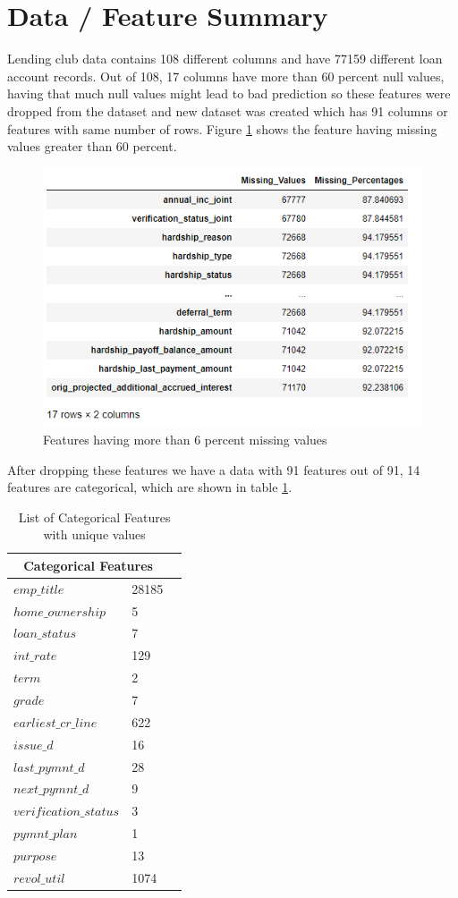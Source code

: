 \documentclass[12pt]{article}
\begin{document}
\section{Data / Feature Summary} 
Lending club data contains 108 different columns and have 77159 different loan account records. Out of 108, 17 columns have more than 60 percent null values, having that much null values might lead to bad prediction so these features were dropped from the dataset and new dataset was created which has 91 columns or features with same number of rows. Figure \ref{fig:MissingValues} shows the feature having missing values greater than 60 percent.
\begin{figure}[h!]
	\centering
	\includegraphics{MissingValues.png}
	\caption{Features having more than 6 percent missing values}
	\label{fig:MissingValues}
\end{figure}
After dropping these features we have a data with 91 features out of 91, 14 features are categorical, which are shown in table \ref{table:1}.
\begin{table}[h!]
	\centering
	\begin{tabular}{ |p{3cm}|p{3cm}|p{3cm}|  }
		\hline
		\multicolumn{2}{|c|}{Categorical Features} \\

		\hline
		$emp\_title$ & 28185 \\
		$home\_ownership$ & 5 \\
		$loan\_status$ & 7 \\
		$int\_rate$ & 129 \\
		$term$ & 2 \\
		$grade$ & 7 \\
		$earliest\_cr\_line$ & 622 \\
		$issue\_d$ & 16 \\
		$last\_pymnt\_d	$ & 28 \\
		$next\_pymnt\_d	$ & 9 \\
		$verification\_status$ & 3 \\
		$pymnt\_plan$ & 1 \\
		$purpose$ & 13 \\
		$revol\_util$ & 1074 \\
		\hline
	\end{tabular}
	\caption{List of Categorical Features with unique values}
	\label{table:1}
\end{table}
\end{document}
